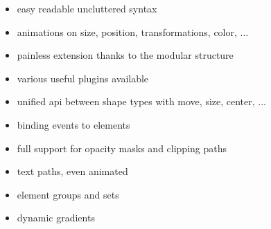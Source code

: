 \begin{itemize}
\item easy readable uncluttered syntax
\item    animations on size, position, transformations, color, ...
 \item   painless extension thanks to the modular structure
    \item various useful plugins available
   \item unified api between shape types with move, size, center, ...
   \item binding events to elements
   \item full support for opacity masks and clipping paths
   \item text paths, even animated
 \item   element groups and sets
\item   dynamic gradients
\end{itemize}







